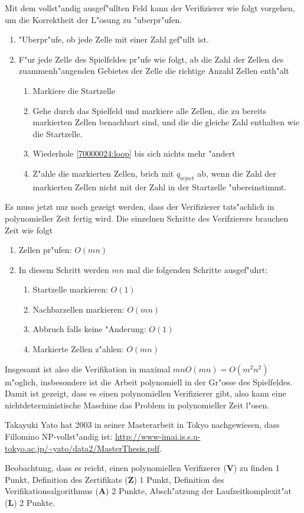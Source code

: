 \begin{loesung}
Mit dem vollst"andig ausgef"ullten Feld kann der Verifizierer wie folgt
vorgehen, um die Korrektheit der L"osung zu "uberpr"ufen.
\begin{enumerate}
\item "Uberpr"ufe, ob jede Zelle mit einer Zahl gef"ullt ist.
\item F"ur jede Zelle des Spielfeldes pr"ufe wie folgt, ab die Zahl der
Zellen des zuammenh"angenden Gebietes der Zelle die richtige Anzahl
Zellen enth"alt
\begin{enumerate}
\item Markiere die Startzelle
\item \label{70000024:loop} Gehe durch das Spielfeld und markiere alle Zellen, die zu bereits
markierten Zellen benachbart sind, und die die gleiche Zahl enthalten wie
die Startzelle.
\item Wiederhole \ref{70000024:loop} bis sich nichts mehr "andert
\item Z"ahle die markierten Zellen, brich mit $q_{\text{reject}}$ ab,
wenn die Zahl der markierten Zellen nicht mit der Zahl in der Startzelle
"ubereinstimmt.
\end{enumerate}
\end{enumerate}
Es muss jetzt nur noch gezeigt werden, dass der Verifizierer tats"achlich
in polynomieller Zeit fertig wird. Die einzelnen Schritte des Verifzierers
brauchen Zeit wie folgt
\begin{enumerate}
\item Zellen pr"ufen: $O(mn)$
\item In diesem Schritt werden $mn$ mal die folgenden Schritte ausgef"uhrt:
\begin{enumerate}
\item Startzelle markieren: $O(1)$
\item Nachbarzellen markieren: $O(mn)$
\item Abbruch falls keine "Anderung: $O(1)$
\item Markierte Zellen z"ahlen: $O(mn)$
\end{enumerate}
\end{enumerate}
Insgesamt ist also die Verifikation in maximal $mnO(mn)=O(m^2n^2)$ m"oglich,
insbesondere ist die Arbeit polynomiell in der Gr"osse des Spielfeldes.
Damit ist gezeigt, dass es einen polynomiellen Verifizierer gibt,
also kann eine nichtdeterministische Maschine das Problem in polynomieller
Zeit l"osen.
\end{loesung}

\begin{diskussion}
Takayuki Yato hat 2003 in seiner Masterarbeit in Tokyo nachgewiesen,
dass Fillomino NP-vollst"andig ist:
\url{http://www-imai.is.s.u-tokyo.ac.jp/~yato/data2/MasterThesis.pdf}.
\end{diskussion}

\begin{bewertung}
Beobachtung, dass es reicht, einen polynomiellen Verifizerer ({\bf V})
zu finden 1 Punkt,
Definition des Zertifikats ({\bf Z}) 1 Punkt,
Definition des Verifikationsalgorithmus ({\bf A}) 2 Punkte,
Absch"atzung der Laufzeitkomplexit"at ({\bf L}) 2 Punkte.
\end{bewertung}

